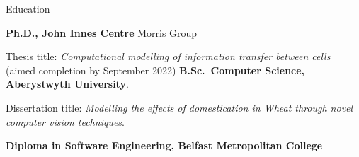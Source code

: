 \begin{rubric}{Education}

\entry*[2018 -- 2022]%
	\textbf{Ph.D., John Innes Centre} Morris Group
	\par Thesis title: \emph{Computational modelling of information transfer
	between cells} (aimed completion by September 2022)
%
\entry*[2014 -- 2018]%
	\textbf{B.Sc.~Computer Science, Aberystwyth University}.\par
	Dissertation title: \emph{Modelling the effects of domestication in Wheat
	through novel computer vision techniques}.

\entry*[2012 -- 2014]%
	\textbf{Diploma in Software Engineering, Belfast Metropolitan College}

\end{rubric}